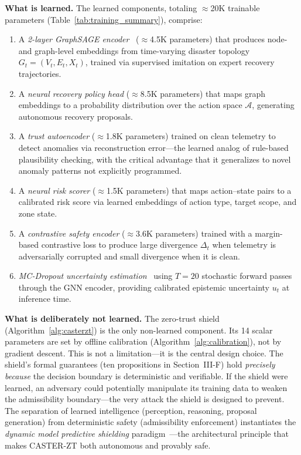 \documentclass[10pt,journal,compsoc]{IEEEtran}
\begin{document}
\noindent\textbf{What is learned.}
The learned components, totaling $\approx$20K trainable parameters (Table~\ref{tab:training_summary}), comprise:
\begin{enumerate}
    \item A \emph{2-layer GraphSAGE encoder}~\cite{hamilton2017graphsage} ($\approx$4.5K parameters) that produces node- and graph-level embeddings from time-varying disaster topology $G_t = (V_t, E_t, X_t)$, trained via supervised imitation on expert recovery trajectories.
    \item A \emph{neural recovery policy head} ($\approx$8.5K parameters) that maps graph embeddings to a probability distribution over the action space $\mathcal{A}$, generating autonomous recovery proposals.
    \item A \emph{trust autoencoder} ($\approx$1.8K parameters) trained on clean telemetry to detect anomalies via reconstruction error---the learned analog of rule-based plausibility checking, with the critical advantage that it generalizes to novel anomaly patterns not explicitly programmed.
    \item A \emph{neural risk scorer} ($\approx$1.5K parameters) that maps action--state pairs to a calibrated risk score via learned embeddings of action type, target scope, and zone state.
    \item A \emph{contrastive safety encoder} ($\approx$3.6K parameters) trained with a margin-based contrastive loss to produce large divergence $\Delta_t$ when telemetry is adversarially corrupted and small divergence when it is clean.
    \item \emph{MC-Dropout uncertainty estimation}~\cite{gal2016dropout} using $T=20$ stochastic forward passes through the GNN encoder, providing calibrated epistemic uncertainty $u_t$ at inference time.
\end{enumerate}

\noindent\textbf{What is deliberately not learned.}
The zero-trust shield (Algorithm~\ref{alg:casterzt}) is the only non-learned component.
Its 14 scalar parameters are set by offline calibration (Algorithm~\ref{alg:calibration}), not by gradient descent.
This is not a limitation---it is the central design choice.
The shield's formal guarantees (ten propositions in Section~III-F) hold \emph{precisely because} the decision boundary is deterministic and verifiable.
If the shield were learned, an adversary could potentially manipulate its training data to weaken the admissibility boundary---the very attack the shield is designed to prevent.
The separation of learned intelligence (perception, reasoning, proposal generation) from deterministic safety (admissibility enforcement) instantiates the \emph{dynamic model predictive shielding} paradigm~\cite{roderick2024dmps}---the architectural principle that makes CASTER-ZT both autonomous and provably safe.
\end{document}
